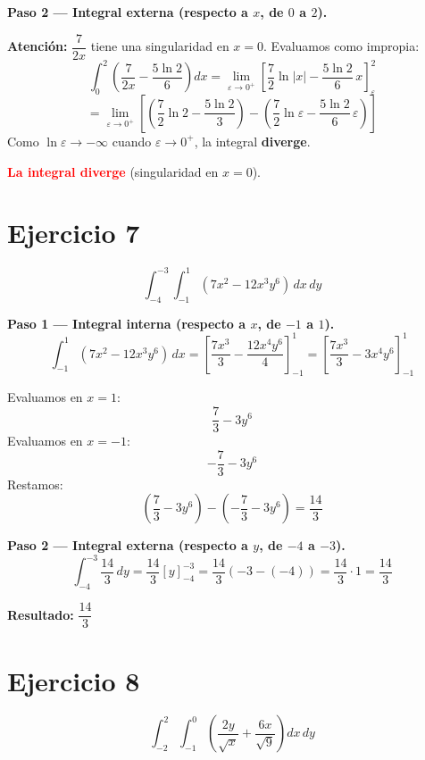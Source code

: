 \documentclass[12pt,a4paper]{article}
\newcommand{\resultado}[1]{%
  \textcolor{resultcolor}{\textbf{Resultado: } $\displaystyle #1$}%
}
\begin{document}
\textbf{Paso 2 — Integral externa (respecto a $x$, de $0$ a $2$).}

\textbf{Atención:} $\dfrac{7}{2x}$ tiene una singularidad en $x = 0$. Evaluamos como impropia:
\[
  \int_{0}^{2} \left(\frac{7}{2x} - \frac{5\ln 2}{6}\right) dx
  = \lim_{\varepsilon \to 0^+} \left[\frac{7}{2}\ln|x| - \frac{5\ln 2}{6}\,x\right]_{\varepsilon}^{2}
\]
\[
  = \lim_{\varepsilon \to 0^+} \left[\left(\frac{7}{2}\ln 2 - \frac{5\ln 2}{3}\right) - \left(\frac{7}{2}\ln \varepsilon - \frac{5\ln 2}{6}\,\varepsilon\right)\right]
\]
Como $\ln\varepsilon \to -\infty$ cuando $\varepsilon\to 0^+$, la integral \textbf{diverge}.

\medskip
\textcolor{red}{\textbf{La integral diverge}} (singularidad en $x = 0$).

\bigskip
\section*{Ejercicio 7}
\[
  \int_{-4}^{-3} \int_{-1}^{1} (7x^2 - 12x^3 y^6) \, dx \, dy
\]

\textbf{Paso 1 — Integral interna (respecto a $x$, de $-1$ a $1$).}
\[
  \int_{-1}^{1} (7x^2 - 12x^3 y^6)\,dx
  = \left[\frac{7x^3}{3} - \frac{12x^4 y^6}{4}\right]_{-1}^{1}
  = \left[\frac{7x^3}{3} - 3x^4 y^6\right]_{-1}^{1}
\]

Evaluamos en $x=1$:
\[
  \frac{7}{3} - 3y^6
\]
Evaluamos en $x=-1$:
\[
  -\frac{7}{3} - 3y^6
\]
Restamos:
\[
  \left(\frac{7}{3} - 3y^6\right) - \left(-\frac{7}{3} - 3y^6\right) = \frac{14}{3}
\]

\textbf{Paso 2 — Integral externa (respecto a $y$, de $-4$ a $-3$).}
\[
  \int_{-4}^{-3} \frac{14}{3}\,dy = \frac{14}{3}\left[y\right]_{-4}^{-3}
  = \frac{14}{3}(-3 - (-4)) = \frac{14}{3}\cdot 1 = \frac{14}{3}
\]

\medskip
\resultado{\dfrac{14}{3}}

\bigskip
\section*{Ejercicio 8}
\[
  \int_{-2}^{2} \int_{-1}^{0} \left(\frac{2y}{\sqrt{x}} + \frac{6x}{\sqrt{9}}\right) dx \, dy
\]
\end{document}
